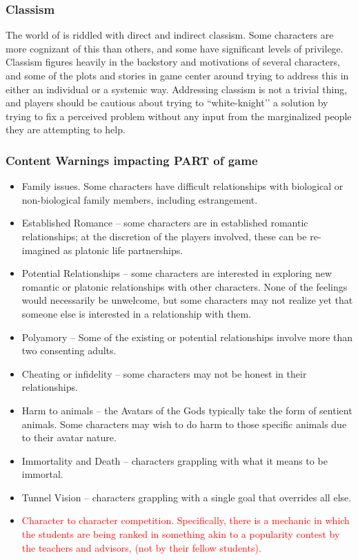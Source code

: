 \documentclass[sheet]{GL2020}
\begin{document}
\subsubsection{Classism}
The world of \pEarth{} is riddled with direct and indirect classism. Some characters are more cognizant of this than others, and some have significant levels of privilege. Classism figures heavily in the backstory and motivations of several characters, and some of the plots and stories in game center around trying to address this in either an individual or a systemic way. Addressing classism is not a trivial thing, and players should be cautious about trying to ``white-knight'’ a solution by trying to fix a perceived problem without any input from the marginalized people they are attempting to help.

\subsubsection{Content Warnings impacting PART of game}
\begin{itemize}
  	\item Family issues. Some characters have difficult relationships with biological or non-biological family members, including estrangement.
	\item Established Romance -- some characters are in established romantic relationships; at the discretion of the players involved, these can be re-imagined as platonic life partnerships.
	\item Potential Relationships -- some characters are interested in exploring new romantic or platonic relationships with other characters. None of the feelings would necessarily be unwelcome, but some characters may not realize yet that someone else is interested in a relationship with them.
	\item Polyamory -- Some of the existing or potential relationships involve more than two consenting adults.
	\item Cheating or infidelity -- some characters may not be honest in their relationships.
	\item Harm to animals -- the Avatars of the Gods typically take the form of sentient animals. Some characters may wish to do harm to those specific animals due to their avatar nature.
	\item Immortality and Death -- characters grappling with what it means to be immortal.
	\item Tunnel Vision -- characters grappling with a single goal that overrides all else.
	\item \textcolor{red}{Character to character competition. Specifically, there is a mechanic in which the students are being ranked in something akin to a popularity contest by the teachers and advisors, (not by their fellow students).}

\end{itemize}
\end{document}
